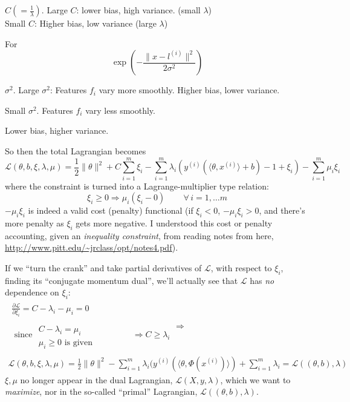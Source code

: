 \documentclass[10pt]{amsart}
\begin{document}
\begin{multicols*}{2}
$C ( = \frac{1}{\lambda})$.  Large $C$: lower bias, high variance.  (small $\lambda$) \\
Small $C$: Higher bias, low variance (large $\lambda$)

For 
\[
\exp{ \left( - \frac{ \| x - l^{(i) } \|^2 }{ 2\sigma^2 } \right) }
\]

$\sigma^2$.  Large $\sigma^2$: Features $f_i$ vary more smoothly.  Higher bias, lower variance.  

Small $\sigma^2$.  Features $f_i  $ vary less smoothly.  

Lower bias, higher variance.  




So then the total Lagrangian becomes
\begin{equation}
  \mathcal{L}(\theta,b,\xi,\lambda,\mu) = \frac{1}{2} \| \theta \|^2 + C\sum_{i=1}^m \xi_i - \sum_{i=1}^m \lambda_i (y^{(i)}(\langle \theta,x^{(i)} \rangle +b)-1 +\xi_i ) - \sum_{i=1}^m \mu_i \xi_i
\end{equation}
where the constraint is turned into a Lagrange-multiplier type relation:
\begin{equation}
\xi_i \geq 0 \Longrightarrow \mu_i(\xi_i - 0) \qquad \, \forall \, i =1,\dots m 
\end{equation}
$-\mu_i\xi_i$ is indeed a valid cost (penalty) functional (if $\xi_i  <0$, $-\mu_i\xi_i >0$, and there's more penalty as $\xi_i$ gets more negative.  I understood this cost or penalty accounting, given an \emph{inequality constraint}, from reading notes from here, \url{http://www.pitt.edu/~jrclass/opt/notes4.pdf}).

If we ``turn the crank'' and take partial derivatives of $\mathcal{L}$, with respect to $\xi_i$, finding its ``conjugate momentum dual'', we'll actually see that $\mathcal{L}$ has \emph{no} dependence on $\xi_i$:
\begin{equation}
\begin{gathered} \begin{gathered}
  \frac{ \partial \mathcal{L}}{ \partial \xi_i} = C-\lambda_i -\mu_i = 0 \\ 
  \text{ since } \begin{aligned} & \quad \\
    C - \lambda_i = \mu_i \\
    \mu_i \geq 0 \text{ is given } \end{aligned} \qquad \, \Longrightarrow C \geq \lambda_i 
  \end{gathered}
  \Longrightarrow \\
  \mathcal{L}(\theta,b,\xi,\lambda,\mu) = \frac{1}{2} \| \theta \|^2 - \sum_{i=1}^m \lambda_i(y^{(i)} ( \langle \theta, \Phi(x^{(i)})\rangle ) + \sum_{i=1}^m \lambda_i  = \mathcal{L}((\theta,b),\lambda)
  \end{gathered}
  \end{equation}
$\xi,\mu$ no longer appear in the dual Lagrangian, $\mathcal{L}(X,y,\lambda)$, which we want to \emph{maximize}, nor in the so-called ``primal'' Lagrangian, $\mathcal{L}((\theta,b),\lambda)$.  


\end{multicols*}
\end{document}
